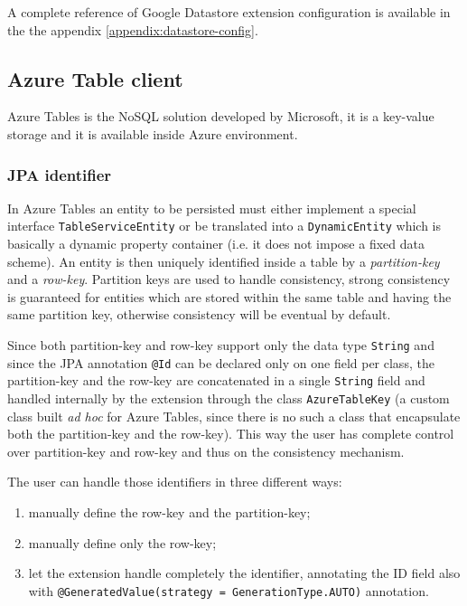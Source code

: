 \newparagraph A complete reference of Google Datastore extension configuration is available in the the appendix \ref{appendix:datastore-config}.

\subsection{Azure Table client}
\label{sec:kundera-table}
Azure Tables \cite{online:azuretable} is the NoSQL solution developed by Microsoft, it is a key-value storage and it is available inside Azure environment.

\subsubsection{JPA identifier}
In Azure Tables an entity to be persisted must either implement a special interface \texttt{TableServiceEntity} or be translated into a \texttt{DynamicEntity} which is basically a dynamic property container (i.e. it does not impose a fixed data scheme).
An entity is then uniquely identified inside a table by a \textit{partition-key} and a \textit{row-key}.
\noindent Partition keys are used to handle consistency, strong consistency is guaranteed for entities which are stored within the same table and having the same partition key, otherwise consistency will be eventual by default.

\noindent Since both partition-key and row-key support only the data type \texttt{String} and since the JPA annotation \texttt{@Id} can be declared only on one field per class, the partition-key and the row-key are concatenated in a single \texttt{String} field and handled internally by the extension through the class \texttt{AzureTableKey} (a custom class built \textit{ad hoc} for Azure Tables, since there is no such a class that encapsulate both the partition-key and the row-key).
\noindent This way the user has complete control over partition-key and row-key and thus on the consistency mechanism.

\newparagraph The user can handle those identifiers in three different ways:
\begin{enumerate}
\item manually define the row-key and the partition-key;
\item manually define only the row-key;
\item let the extension handle completely the identifier, annotating the ID field also with \texttt{@GeneratedValue(strategy = GenerationType.AUTO)} annotation.
\end{enumerate}

